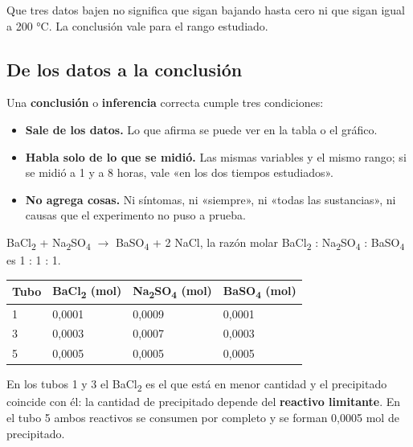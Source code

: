 \begin{ojo} Que tres datos bajen no significa que sigan bajando hasta cero ni que sigan igual a 200 °C. La conclusión vale para el rango estudiado.\end{ojo}
\subsection{De los datos a la conclusión}
Una \textbf{conclusión} o \textbf{inferencia} correcta cumple tres condiciones:

 
\begin{itemize}
  \item \textbf{Sale de los datos.} Lo que afirma se puede ver en la tabla o el gráfico.
  \item \textbf{Habla solo de lo que se midió.} Las mismas variables y el mismo rango; si se midió a 1 y a 8 horas, vale «en los dos tiempos estudiados».
  \item \textbf{No agrega cosas.} Ni síntomas, ni «siempre», ni «todas las sustancias», ni causas que el experimento no puso a prueba.
\end{itemize}
 
\begin{ejemplo} BaCl\textsubscript{2} + Na\textsubscript{2}SO\textsubscript{4} \ensuremath{\rightarrow} BaSO\textsubscript{4} + 2 NaCl, la razón molar BaCl\textsubscript{2} : Na\textsubscript{2}SO\textsubscript{4} : BaSO\textsubscript{4} es 1 : 1 : 1.
\begin{center}\small
\begin{tabular}{@{}llll@{}}
\toprule
\textbf{Tubo} & \textbf{BaCl\textsubscript{2} (mol)} & \textbf{Na\textsubscript{2}SO\textsubscript{4} (mol)} & \textbf{BaSO\textsubscript{4} (mol)} \\
\midrule
1 & 0,0001 & 0,0009 & 0,0001 \\
3 & 0,0003 & 0,0007 & 0,0003 \\
5 & 0,0005 & 0,0005 & 0,0005 \\
\bottomrule
\end{tabular}
\end{center}
 En los tubos 1 y 3 el BaCl\textsubscript{2} es el que está en menor cantidad y el precipitado coincide con él: la cantidad de precipitado depende del \textbf{reactivo limitante}. En el tubo 5 ambos reactivos se consumen por completo y se forman 0,0005 mol de precipitado.\end{ejemplo}
  
